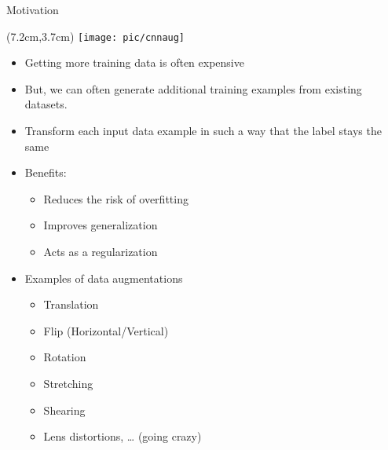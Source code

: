 \documentclass[serif, aspectratio=169]{beamer}
\begin{document}
\begin{frame}{Motivation}
	\begin{textblock*}{5cm}(7.2cm,3.7cm) %
		\texttt{[image: pic/cnnaug]}
	\end{textblock*}
	
	\begin{itemize}
		\item Getting more training data is often expensive
		\item But, we can often generate additional training examples from existing datasets.
		\item Transform each input data example in such a way that the label stays the same
		\item Benefits:
		\begin{itemize}
			\item Reduces the risk of overfitting
			\item Improves generalization
			\item Acts as a regularization
		\end{itemize}
		\item Examples of data augmentations
		\begin{itemize}
			\item Translation
			\item Flip (Horizontal/Vertical)
			\item Rotation
			\item Stretching
			\item Shearing
			\item Lens distortions, … (going crazy)
		\end{itemize}
	\end{itemize}
\end{frame}
\end{document}
